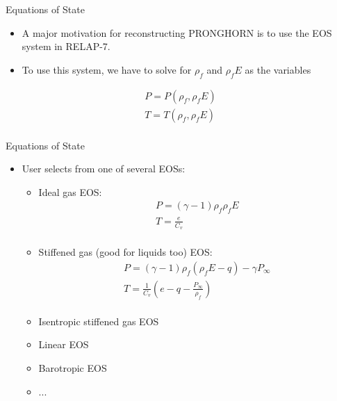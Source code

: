 \documentclass{beamer}
\begin{document}

\begin{frame}{Equations of State}

\begin{itemize}
\item A major motivation for reconstructing PRONGHORN is to use the EOS system in RELAP-7.
\item To use this system, we have to solve for \(\rho_f\) and \(\rho_fE\) as the variables
\end{itemize}

\begin{equation}
\begin{aligned}
P=P(\rho_f,\rho_fE)\\
T=T(\rho_f,\rho_fE)\\
\end{aligned}
\end{equation}

\end{frame}


\begin{frame}{Equations of State}

\begin{itemize}
\item User selects from one of several EOSs:
	\begin{itemize}
		\item Ideal gas EOS:
		\begin{equation}
		\begin{aligned}
		P=(\gamma-1)\rho_f \rho_fE\\
		T=\frac{e}{C_v}\\
		\end{aligned}
		\end{equation}
		\item Stiffened gas (good for liquids too) EOS:
		\begin{equation}
		\begin{aligned}
		P=(\gamma-1)\rho_f(\rho_fE-q)-\gamma P_\infty\\
		T=\frac{1}{C_v}\left(e-q-\frac{P_\infty}{\rho_f}\right)\\
		\end{aligned}
		\end{equation}
		\item Isentropic stiffened gas EOS
		\item Linear EOS
		\item Barotropic EOS
		\item ...
	\end{itemize}
\end{itemize}

\end{frame}
\end{document}
